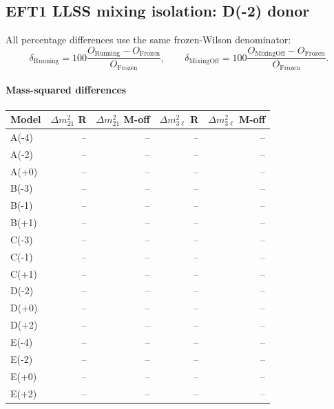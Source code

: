 \subsection*{EFT1 LLSS mixing isolation: D(-2) donor}
All percentage differences use the same frozen-Wilson denominator:
\[\delta_{\mathrm{Running}}=100\frac{O_{\mathrm{Running}}-O_{\mathrm{Frozen}}}{O_{\mathrm{Frozen}}},\qquad\delta_{\mathrm{MixingOff}}=100\frac{O_{\mathrm{MixingOff}}-O_{\mathrm{Frozen}}}{O_{\mathrm{Frozen}}}.\]
\paragraph{Mass-squared differences}
\begin{center}
\begin{tabular}{lrrrr}
\hline
Model & $\Delta m^2_{21}$ R & $\Delta m^2_{21}$ M-off & $\Delta m^2_{3\ell}$ R & $\Delta m^2_{3\ell}$ M-off \\
\hline
A(-4) & -- & -- & -- & -- \\
A(-2) & -- & -- & -- & -- \\
A(+0) & -- & -- & -- & -- \\
B(-3) & -- & -- & -- & -- \\
B(-1) & -- & -- & -- & -- \\
B(+1) & -- & -- & -- & -- \\
C(-3) & -- & -- & -- & -- \\
C(-1) & -- & -- & -- & -- \\
C(+1) & -- & -- & -- & -- \\
D(-2) & -- & -- & -- & -- \\
D(+0) & -- & -- & -- & -- \\
D(+2) & -- & -- & -- & -- \\
E(-4) & -- & -- & -- & -- \\
E(-2) & -- & -- & -- & -- \\
E(+0) & -- & -- & -- & -- \\
E(+2) & -- & -- & -- & -- \\
\hline
\end{tabular}
\end{center}
